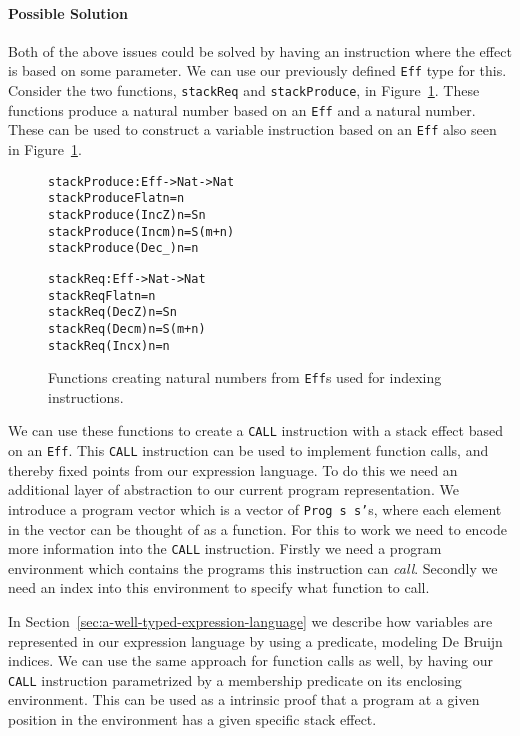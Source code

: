 \paragraph{Possible Solution}
Both of the above issues could be solved by having an instruction where the effect is based on some parameter. We can use our previously defined \texttt{Eff} type for this. Consider the two functions, \texttt{stackReq} and \texttt{stackProduce}, in Figure~\ref{fig:stack_effect_functions}. These functions produce a natural number based on an \texttt{Eff} and a natural number. These can be used to construct a variable instruction based on an \texttt{Eff} also seen in Figure~\ref{fig:stack_effect_functions}. 

\begin{figure}
\begin{alltt}
stackProduce : Eff -> Nat -> Nat
stackProduce Flat n = n
stackProduce (Inc Z) n = S n
stackProduce (Inc m) n = S (m+n)
stackProduce (Dec _) n = n

stackReq : Eff -> Nat -> Nat
stackReq Flat n = n
stackReq (Dec Z) n = S n
stackReq (Dec m) n = S (m+n)
stackReq (Inc x) n = n
\end{alltt}
\caption{Functions creating natural numbers from \texttt{Eff}s used for indexing instructions.}
\label{fig:stack_effect_functions}
\end{figure}

We can use these functions to create a \texttt{CALL} instruction with a stack effect based on an \texttt{Eff}. This \texttt{CALL} instruction can be used to implement function calls, and thereby fixed points from our expression language. To do this we need an additional layer of abstraction to our current program representation. We introduce a program vector which is a vector of \texttt{Prog s s'}s, where each element in the vector can be thought of as a function. For this to work we need to encode more information into the \texttt{CALL} instruction. Firstly we need a program environment which contains the programs this instruction can \emph{call}. Secondly we need an index into this environment to specify what function to call.

In Section~\ref{sec:a-well-typed-expression-language} we describe how variables are represented in our expression language by using a predicate, modeling De Bruijn indices. We can use the same approach for function calls as well, by having our \texttt{CALL} instruction parametrized by a membership predicate on its enclosing environment. This can be used as a intrinsic proof that a program at a given position in the environment has a given specific stack effect. 

